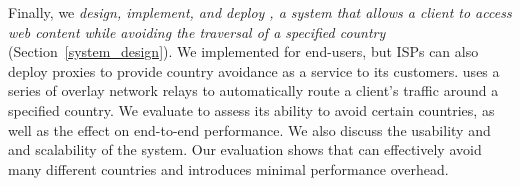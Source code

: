 Finally, we {\em design, implement, and deploy \system{}, a system that allows
a client to access web content while avoiding the traversal of a specified
country} (Section~\ref{system_design}).  We implemented \system{} for
end-users, 
but ISPs can also deploy \system{} proxies to provide country
avoidance as a service to its customers.  \system{} uses a series of overlay
network relays to automatically route a client's traffic around a specified
country.  We evaluate \system{} to assess its ability to avoid certain
countries, as well as the effect on end-to-end performance. We
also discuss the usability and and scalability of the system.  Our evaluation
shows that \system{} can effectively avoid many different countries and
introduces minimal performance overhead. 
